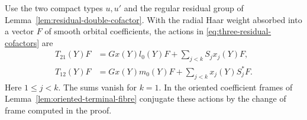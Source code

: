 \begin{auxlemma}\label{lem:residual-single-cofactors}
Use the two compact types \(u,u'\) and the regular residual group
of Lemma~\ref{lem:residual-double-cofactor}. With the radial Haar
weight absorbed into a vector \(F\) of smooth orbital coefficients, the actions in \eqref{eq:three-residual-cofactors} are
\[
\begin{aligned}
 T_{21}(Y)F &= Gx(Y)l_0(Y)F+\sum_{j<k}S_j x_j(Y)F,\\
 T_{12}(Y)F &= Gx(Y)m_0(Y)F+\sum_{j<k}x_j(Y) S_j^*F .
\end{aligned}
\]
Here \(1\le j<k\). The sums vanish for \(k=1\). In the oriented coefficient frames of Lemma~\ref{lem:oriented-terminal-fibre} conjugate these actions by the change of frame computed in the proof.
\end{auxlemma}
